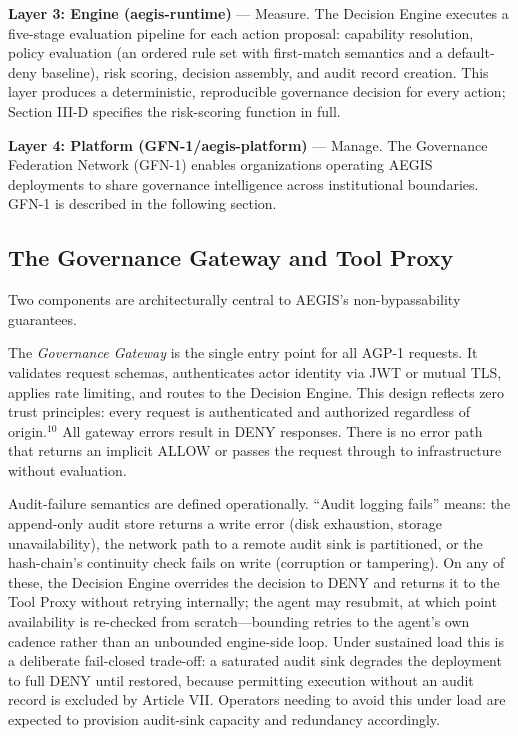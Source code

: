 \documentclass{IEEEcsmag}
\begin{document}
{\bf Layer 3: Engine (aegis-runtime)} --- Measure. The Decision Engine executes a five-stage evaluation pipeline for each action proposal: capability resolution, policy evaluation (an ordered rule set with first-match semantics and a default-deny baseline), risk scoring, decision assembly, and audit record creation. This layer produces a deterministic, reproducible governance decision for every action; Section III-D specifies the risk-scoring function in full.

{\bf Layer 4: Platform (GFN-1/aegis-platform)} --- Manage. The Governance Federation Network (GFN-1) enables organizations operating AEGIS deployments to share governance intelligence across institutional boundaries. GFN-1 is described in the following section.

\subsection{The Governance Gateway and Tool Proxy}

Two components are architecturally central to AEGIS's non-bypassability guarantees.

The {\it Governance Gateway} is the single entry point for all AGP-1 requests. It validates request schemas, authenticates actor identity via JWT or mutual TLS, applies rate limiting, and routes to the Decision Engine. This design reflects zero trust principles: every request is authenticated and authorized regardless of origin.$^{10}$ All gateway errors result in DENY responses. There is no error path that returns an implicit ALLOW or passes the request through to infrastructure without evaluation.

Audit-failure semantics are defined operationally. ``Audit logging fails'' means: the append-only audit store returns a write error (disk exhaustion, storage unavailability), the network path to a remote audit sink is partitioned, or the hash-chain's continuity check fails on write (corruption or tampering). On any of these, the Decision Engine overrides the decision to DENY and returns it to the Tool Proxy without retrying internally; the agent may resubmit, at which point availability is re-checked from scratch---bounding retries to the agent's own cadence rather than an unbounded engine-side loop. Under sustained load this is a deliberate fail-closed trade-off: a saturated audit sink degrades the deployment to full DENY until restored, because permitting execution without an audit record is excluded by Article VII. Operators needing to avoid this under load are expected to provision audit-sink capacity and redundancy accordingly.
\end{document}
